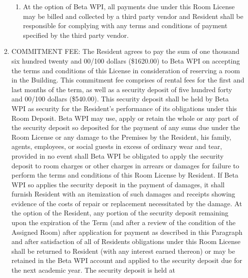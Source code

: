 \documentclass[legalpaper, 12pt]{article} \usepackage{lease}
\begin{document}
\begin{enumerate}
\begin{enumerate}[label=\Alph*.]
                \item At the option of Beta WPI, all payments due under this
                        Room License may be billed and collected by a third
                        party vendor and Resident shall be responsible for
                        complying with any terms and conditions of payment
                        specified by the third party vendor.

        \end{enumerate} 

        \item COMMITMENT FEE: The Resident agrees to pay the sum of one thousand
                six hundred twenty and 00/100 dollars (\$1620.00) to Beta WPI on
                accepting the terms and conditions of this License in
                consideration of reserving a room in the Building.  This
                commitment fee comprises of rental fees for the first and last
                months of the term, as well as a security deposit of five
                hundred forty and 00/100 dollars (\$540.00). This security
                deposit shall be held by Beta WPI as security for the Resident’s
                performance of its obligations under this Room Deposit.  Beta
                WPI may use, apply or retain the whole or any part of the
                security deposit so deposited for the payment of any sums due
                under the Room License or any damage to the Premises by the
                Resident, his family, agents, employees, or social guests in
                excess of ordinary wear and tear, provided in no event shall
                Beta WPI be obligated to apply the security deposit to room
                charges or other charges in arrears or damages for failure to
                perform the terms and conditions of this Room License by
                Resident. If Beta WPI so applies the security deposit in the
                payment of damages, it shall furnish Resident with an
                itemization of such damages and receipts showing evidence of the
                costs of repair or replacement necessitated by the damage.  At
                the option of the Resident, any portion of the security deposit
                remaining upon the expiration of the Term (and after a review of
                the condition of the Assigned Room) after application for
                payment as described in this Paragraph and after satisfaction of
                all of Residents obligations under this Room License shall be
                returned to Resident (with any interest earned thereon) or may
                be retained in the Beta WPI account and applied to the security
                deposit due for the next academic year.  The security deposit is
                held at 


\end{enumerate}
\end{document}
